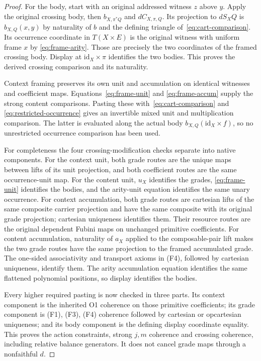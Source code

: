 \documentclass[11pt,a4paper]{article}
\theoremstyle{definition}
\newcommand{\id}{\mathrm{id}}
\begin{document}
\begin{proof}
For the body, start with an original addressed witness $z$ above $y$.
Apply the original crossing body, then $b_{X,\pi^*Q}$ and $dC_{X,\pi,Q}$.
Its projection to $dS_XQ$ is $b_{X,Q}(x,y)$ by naturality of $b$ and the
defining triangle of~\eqref{eq:cart-comparison}. Its occurrence coordinate
in $T(X\times E)$ is the original witness with uniform frame $x$ by
\eqref{eq:frame-arity}. Those are precisely the two coordinates of the
framed crossing body. Display at $\id_X\times\pi$ identifies the two
bodies. This proves the derived crossing comparison and its naturality.

Context framing preserves its own unit and accumulation on identical
witnesses and coefficient maps. Equations~\eqref{eq:frame-unit} and
\eqref{eq:frame-accum} supply the strong content comparisons. Pasting
these with~\eqref{eq:cart-comparison} and
\eqref{eq:restricted-occurrence} gives an invertible mixed unit and
multiplication comparison. The latter is evaluated along the actual body
$b_{X,Q}(\id_X\times f)$, so no unrestricted occurrence comparison has
been used.

For completeness the four crossing-modification checks separate into native
components. For the context unit, both grade routes are the unique maps
between lifts of its unit projection, and both coefficient routes are the
same occurrence-unit map. For the content unit, $u_X$ identifies the grades,
\eqref{eq:frame-unit} identifies the bodies, and the arity-unit equation
identifies the same unary occurrence. For context accumulation, both grade
routes are cartesian lifts of the same composite carrier projection and
have the same composite with its original grade projection; cartesian
uniqueness identifies them. Their resource routes are the original dependent
Fubini maps on unchanged primitive coefficients. For content accumulation,
naturality of $a_X$ applied to the composable-pair lift makes the two grade
routes have the same projection to the framed accumulated grade. The
one-sided associativity and transport axioms in (F4), followed by cartesian
uniqueness, identify them. The arity accumulation equation identifies the
same flattened polynomial positions, so display identifies the bodies.

Every higher required pasting is now checked in three parts. Its context
component is the inherited O1 coherence on those primitive coefficients;
its grade component is (F1), (F3), (F4) coherence followed by cartesian or
opcartesian uniqueness; and its body component is the defining display
coordinate equality. This proves the action constraints, strong $j,m$
coherence and crossing coherence, including relative balance generators.
It does not cancel grade maps through a nonfaithful $d$.


\end{proof}
\end{document}
